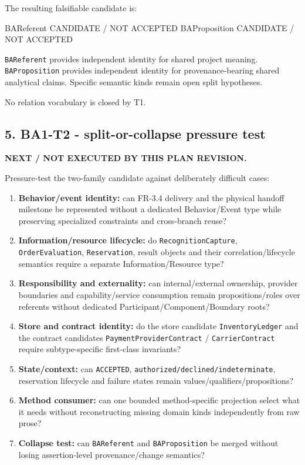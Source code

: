 \documentclass[
]{article}
\newenvironment{Shaded}{}{}
\newcommand{\NormalTok}[1]{#1}
\providecommand{\tightlist}{%
  \setlength{\itemsep}{0pt}\setlength{\parskip}{0pt}}
\begin{document}
The resulting falsifiable candidate is:

\begin{Shaded}
\begin{Highlighting}[]
\NormalTok{BAReferent     CANDIDATE / NOT ACCEPTED}
\NormalTok{BAProposition  CANDIDATE / NOT ACCEPTED}
\end{Highlighting}
\end{Shaded}

\texttt{BAReferent} provides independent identity for shared project
meaning. \texttt{BAProposition} provides independent identity for
provenance-bearing shared analytical claims. Specific semantic kinds
remain open split hypotheses.

No relation vocabulary is closed by T1.

\subsection{5. BA1-T2 - split-or-collapse pressure
test}\label{5-ba1-t2---split-or-collapse-pressure-test}

\textbf{NEXT / NOT EXECUTED BY THIS PLAN REVISION.}

Pressure-test the two-family candidate against deliberately difficult
cases:

\begin{enumerate}
\def\labelenumi{\arabic{enumi}.}
\tightlist
\item
  \textbf{Behavior/event identity:} can FR-3.4 delivery and the physical
  handoff milestone be represented without a dedicated Behavior/Event
  type while preserving specialized constraints and cross-branch reuse?
\item
  \textbf{Information/resource lifecycle:} do
  \texttt{RecognitionCapture}, \texttt{OrderEvaluation},
  \texttt{Reservation}, result objects and their correlation/lifecycle
  semantics require a separate Information/Resource type?
\item
  \textbf{Responsibility and externality:} can internal/external
  ownership, provider boundaries and capability/service consumption
  remain propositions/roles over referents without dedicated
  Participant/Component/Boundary roots?
\item
  \textbf{Store and contract identity:} do the store candidate
  \texttt{InventoryLedger} and the contract candidates
  \texttt{PaymentProviderContract} / \texttt{CarrierContract} require
  subtype-specific first-class invariants?
\item
  \textbf{State/context:} can \texttt{ACCEPTED},
  \texttt{authorized/declined/indeterminate}, reservation lifecycle and
  failure states remain values/qualifiers/propositions?
\item
  \textbf{Method consumer:} can one bounded method-specific projection
  select what it needs without reconstructing missing domain kinds
  independently from raw prose?
\item
  \textbf{Collapse test:} can \texttt{BAReferent} and
  \texttt{BAProposition} be merged without losing assertion-level
  provenance/change semantics?
\end{enumerate}
\end{document}

